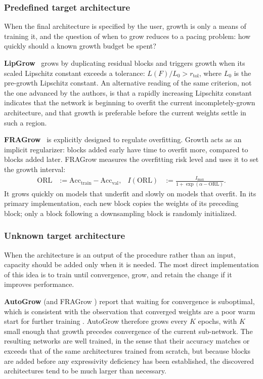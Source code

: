\subsubsection{Predefined target architecture}

When the final architecture is specified by the user, growth is only a means of
training it, and the question of when to grow reduces to a pacing problem: how
quickly should a known growth budget be spent?

\textbf{LipGrow}~\citep{dong_towards_2020} grows by duplicating residual blocks and triggers growth when its scaled Lipschitz constant exceeds a tolerance: $L(F)/L_0 >r_{\mathrm{tol}}$, where $L_0$ is the pre-growth Lipschitz constant. An alternative reading of the same criterion, not the one advanced by the
authors, is that a rapidly increasing Lipschitz constant indicates that the network is beginning to overfit the current incompletely-grown architecture, and that growth is preferable before the current weights settle in such a region.

\textbf{FRAGrow}~\citep{wu_when_2024} is explicitly designed to regulate overfitting. Growth acts as an implicit regularizer: blocks added early have time to overfit more, compared to blocks added later. FRAGrow measures the overfitting risk level and uses it to set the growth interval:
\begin{align}\label{eq:fragrow_main}
\mathrm{ORL}
&:=\mathrm{Acc}_{\mathrm{train}}-\mathrm{Acc}_{\mathrm{val}},
& I(\mathrm{ORL})
&:=\frac{I_{\max}}{1+\exp(\alpha-\mathrm{ORL})}.
\end{align}
It grows quickly on models that underfit and slowly on models that overfit. In its primary implementation, each new block copies the weights of its preceding block; only a block following a downsampling block is randomly initialized.

\subsubsection{Unknown target architecture}

When the architecture is an output of the procedure rather than an input, capacity should be added only when it is
needed. The most direct implementation of this idea is to train until
convergence, grow, and retain the change if it improves performance.

\textbf{AutoGrow} \citep{wen_autogrow_2020} (and FRAGrow \citep{wu_when_2024})
report that waiting for convergence is suboptimal, which is consistent with the
observation that converged weights are a poor warm start for further training
\citep{ash_warm-starting_2020}. AutoGrow therefore grows every $K$ epochs,
with $K$ small enough that growth precedes convergence of the current
sub-network. The resulting networks are well trained, in the
sense that their accuracy matches or exceeds that of the same architectures trained from
scratch, but because blocks are added before any expressivity deficiency has been
established, the discovered architectures tend to be much larger than necessary.

